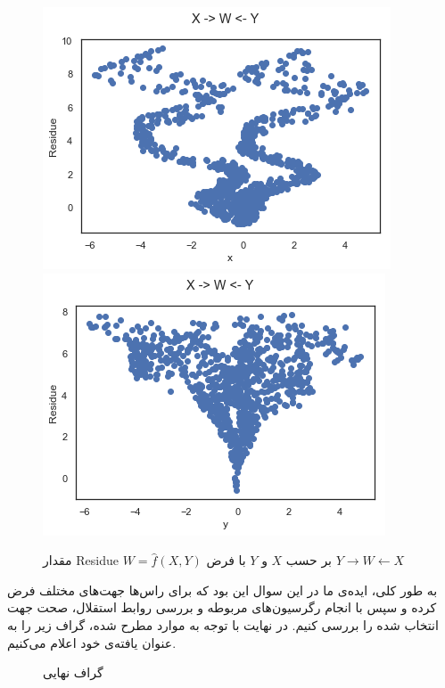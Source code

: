 \documentclass{article}
\begin{document}
\begin{itemize}
\begin{figure}[h]
\centering
\begin{floatrow}
\includegraphics[scale=0.45]{back1.png}
\includegraphics[scale=0.45]{back2.png}
\end{floatrow}

\caption{
مقدار Residue
$W = \hat{f}(X, Y)$
بر حسب $X$ و $Y$ با فرض 
$Y \rightarrow W \leftarrow X$
}
\label{backward}
\end{figure}
\end{itemize}

به طور کلی، ایده‌ی ما در این سوال این بود که برای راس‌ها جهت‌های مختلف فرض کرده و سپس با انجام رگرسیون‌های مربوطه و بررسی روابط استقلال، صحت جهت انتخاب شده را بررسی کنیم. در نهایت با توجه به موارد مطرح شده، گراف زیر را به عنوان یافته‌ی خود اعلام می‌کنیم.
\begin{figure}[h]
\caption{گراف نهایی}
\label{final}
\end{figure}
\end{document}
